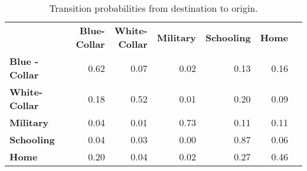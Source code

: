 \begin{ThreePartTable}

	\begin{longtable}[c]{@{}lrrrrrr@{}}
		\caption{Transition probabilities from destination to origin.}
		\label{tab:TransitionProbabilitiesDestinationToOrigin}

		\setlength\extrarowheight{2.5pt}
		
		\\
		\toprule
   & \thead{\textbf{Blue-} \\ \textbf{Collar}}    & \thead{\textbf{White-} \\ \textbf{Collar}}  & \textbf{Military} & \textbf{Schooling} & \textbf{Home}   \\ \midrule
		\endfirsthead
		
\textbf{Blue	-Collar }&	0.62	&	0.07	&	0.02	&	0.13	&	0.16	\\
\textbf{White-Collar	}&	0.18	&	0.52	&	0.01	&	0.20	&	0.09	\\
\textbf{Military}	&	0.04	&	0.01	&	0.73	&	0.11	&	0.11	\\
\textbf{Schooling}	&	0.04	&	0.03	&	0.00	&	0.87	&	0.06	\\
\textbf{Home}	&	0.20	&	0.04	&	0.02	&	0.27	&	0.46	\\
  \bottomrule
	\end{longtable}
\end{ThreePartTable}